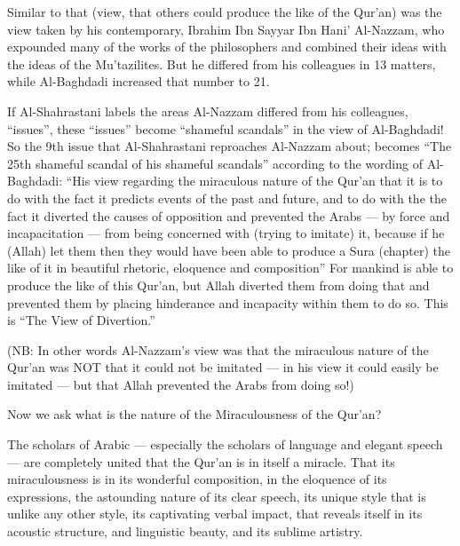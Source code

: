 \documentclass[12pt]{book}
\begin{document}

Similar to that (view, that others could produce the like of the Qur’an) was
the view taken by his contemporary, Ibrahim Ibn Sayyar Ibn Hani’ Al-Nazzam, who
expounded many of the works of the philosophers and combined their ideas with
the ideas of the Mu’tazilites\footnotemark. But he differed from his colleagues in 13
matters, while Al-Baghdadi increased that number to 21.


If Al-Shahrastani labels the areas Al-Nazzam differed from his colleagues,
“issues”, these “issues” become “shameful scandals” in the view of Al-Baghdadi!
So the 9th issue that Al-Shahrastani reproaches Al-Nazzam about; becomes “The
25th shameful scandal of his shameful scandals” according to the wording of
Al-Baghdadi: “His view regarding the miraculous nature of the Qur’an that it is
to do with the fact it predicts events of the past and future, and to do with
the the fact it diverted the causes of opposition and prevented the Arabs — by
force and incapacitation — from being concerned with (trying to imitate) it,
because if he (Allah) let them then they would have been able to produce a Sura
(chapter) the like of it in beautiful rhetoric, eloquence and composition” For
mankind is able to produce the like of this Qur’an, but Allah diverted them
from doing that and prevented them by placing hinderance and incapacity within
them to do so. This is “The View of Divertion.”\footnotemark

(NB: In other words Al-Nazzam’s view was that the miraculous nature of the
Qur’an was NOT that it could not be imitated — in his view it could easily be
imitated — but that Allah prevented the Arabs from doing so!)


Now we ask what is the nature of the Miraculousness of the Qur’an?

The scholars of Arabic — especially the scholars of language and elegant speech
— are completely united that the Qur’an is in itself a miracle. That its
miraculousness is in its wonderful composition, in the eloquence of its
expressions, the astounding nature of its clear speech, its unique style that
is unlike any other style, its captivating verbal impact, that reveals itself
in its acoustic structure, and linguistic beauty, and its sublime artistry.
\end{document}
